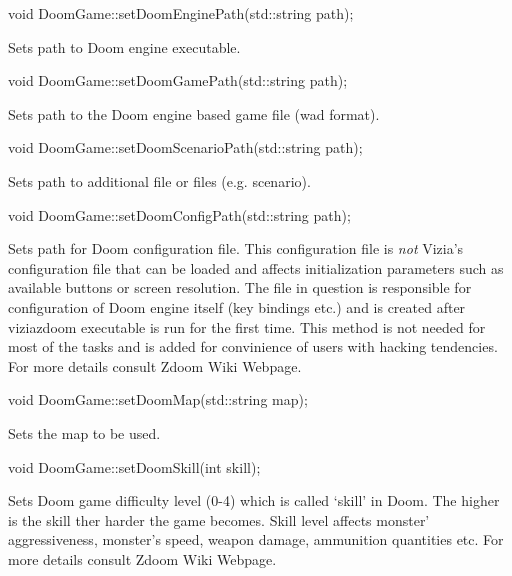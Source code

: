\vspace{20pt}
\begin{clinee}
void DoomGame::setDoomEnginePath(std::string path);
\end{clinee}

Sets path to Doom engine executable.


\vspace{20pt}
\begin{clinee}
void DoomGame::setDoomGamePath(std::string path);
\end{clinee}

Sets path to the Doom engine based game file (wad format).


\vspace{20pt}
\begin{clinee}
void DoomGame::setDoomScenarioPath(std::string path);
\end{clinee}
	Sets path to additional file or files (e.g. scenario).

\vspace{20pt}
\begin{clinee}
void DoomGame::setDoomConfigPath(std::string path);
\end{clinee}
	Sets path for Doom configuration file. This configuration file is \emph{not} Vizia's configuration file that can be loaded and affects initialization parameters such as available buttons or screen resolution. The file in question is responsible for configuration of Doom engine itself (key bindings etc.) and is created after viziazdoom executable is run for the first time. This method is not needed for most of the tasks and is added for convinience of users with hacking tendencies. For more details consult Zdoom Wiki Webpage\cite{zdoom-wiki}.

\vspace{20pt}
\begin{clinee}
void DoomGame::setDoomMap(std::string map);
\end{clinee}
	Sets the map to be used.


\vspace{20pt}
\begin{clinee}      
void DoomGame::setDoomSkill(int skill);
\end{clinee}
	Sets Doom game difficulty level (0-4) which is called `skill' in Doom. The higher is the skill ther harder the game becomes. Skill level affects monster' aggressiveness, monster's speed, weapon damage, ammunition quantities etc. For more details consult Zdoom Wiki Webpage\cite{zdoom-wiki}.

